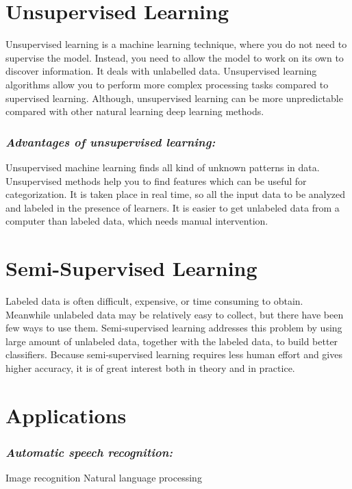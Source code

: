 \section{Unsupervised Learning}
Unsupervised learning is a machine learning technique, where you do not need to supervise the model. Instead, you need to allow the model to work on its own to discover information. It deals with unlabelled data. Unsupervised learning algorithms allow you to perform more complex processing tasks compared to supervised learning. Although, unsupervised learning can be more unpredictable compared with other natural learning deep learning methods.

\subsubsection{\textit{Advantages of unsupervised learning:}}
Unsupervised machine learning finds all kind of unknown patterns in data.
Unsupervised methods help you to find features which can be useful for categorization.
It is taken place in real time, so all the input data to be analyzed and labeled in the presence of learners.
It is easier to get unlabeled data from a computer than labeled data, which needs manual intervention.

\section{Semi-Supervised Learning}
Labeled data is often difficult, expensive, or time consuming to obtain.  Meanwhile unlabeled data may be relatively easy to collect, but there have been few ways to use them. Semi-supervised learning addresses this problem by using large amount of unlabeled data, together with the labeled data, to build better classifiers. Because semi-supervised learning requires less human effort and gives higher accuracy, it is of great interest both in theory and in practice.

\section{Applications}
\subsubsection{\textit{Automatic speech recognition:}}
Image recognition
Natural language processing

